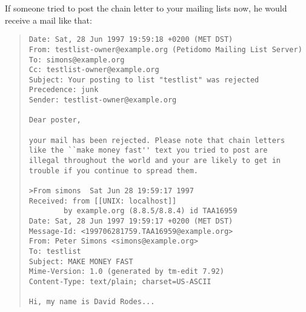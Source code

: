 \documentclass[a4paper,11pt]{scrreprt}
\begin{document}
If someone tried to post the chain letter to your mailing lists now,
he would receive a mail like that:
\begin{quote}
\begin{verbatim}
Date: Sat, 28 Jun 1997 19:59:18 +0200 (MET DST)
From: testlist-owner@example.org (Petidomo Mailing List Server)
To: simons@example.org
Cc: testlist-owner@example.org
Subject: Your posting to list "testlist" was rejected
Precedence: junk
Sender: testlist-owner@example.org

Dear poster,

your mail has been rejected. Please note that chain letters
like the ``make money fast'' text you tried to post are
illegal throughout the world and your are likely to get in
trouble if you continue to spread them.

>From simons  Sat Jun 28 19:59:17 1997
Received: from [[UNIX: localhost]]
        by example.org (8.8.5/8.8.4) id TAA16959
Date: Sat, 28 Jun 1997 19:59:17 +0200 (MET DST)
Message-Id: <199706281759.TAA16959@example.org>
From: Peter Simons <simons@example.org>
To: testlist
Subject: MAKE MONEY FAST
Mime-Version: 1.0 (generated by tm-edit 7.92)
Content-Type: text/plain; charset=US-ASCII

Hi, my name is David Rodes...
\end{verbatim}
\end{quote}
\end{document}
